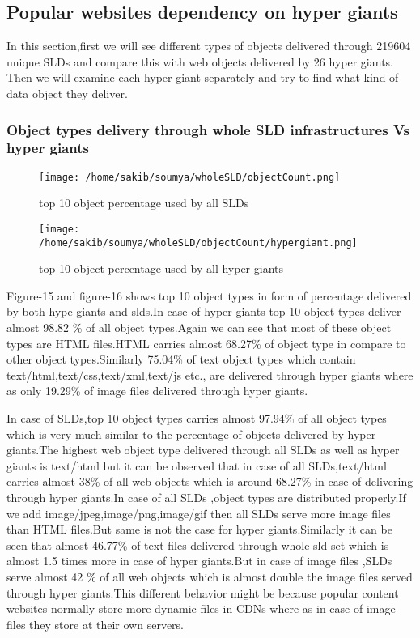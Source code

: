 \subsection{Popular websites dependency on hyper giants}
In this section,first we will see different types of objects delivered through 219604 unique SLDs and compare this with web objects delivered by 26 hyper giants. Then we will examine each hyper giant separately and try to find what kind of data object they deliver. 
\subsubsection{Object types delivery through whole SLD infrastructures Vs hyper giants}
\begin{figure}[h]
\texttt{[image: /home/sakib/soumya/wholeSLD/objectCount.png]}
\centering
\caption{top 10 object percentage used by all SLDs}
\end{figure}
\begin{figure}[h]
\texttt{[image: /home/sakib/soumya/wholeSLD/objectCount/hypergiant.png]}
\centering
\caption{top 10 object percentage used by all hyper giants}
\end{figure}

Figure-15 and figure-16 shows top 10 object types in form of percentage delivered by both hype giants and slds.In case of hyper giants top 10 object types deliver almost 98.82 \% of all object types.Again we can see that most of these object types are HTML files.HTML carries almost 68.27\% of object type in compare to other object types.Similarly 75.04\% of  text object types which contain text/html,text/css,text/xml,text/js etc., are delivered through hyper giants where as only 19.29\% of image files delivered through hyper giants.

In case of SLDs,top 10 object types carries almost 97.94\% of all object types  which is very much similar to the percentage of objects delivered by hyper giants.The highest web object type delivered through all SLDs as well as hyper giants is text/html but it can be observed that in case of all SLDs,text/html carries almost 38\% of all web objects which is around 68.27\% in case of delivering through hyper giants.In case of all SLDs ,object types are distributed properly.If we add image/jpeg,image/png,image/gif then all SLDs serve more image files than HTML files.But same is not the case for hyper giants.Similarly it can be seen that almost 46.77\% of text files delivered through whole sld set which is almost 1.5 times more in case of hyper giants.But in case of image files ,SLDs serve almost 42 \% of all web objects which is almost double the image files served through hyper giants.This different behavior might be because popular content websites normally store more dynamic files in CDNs where as in case of image files they store at their own servers.

